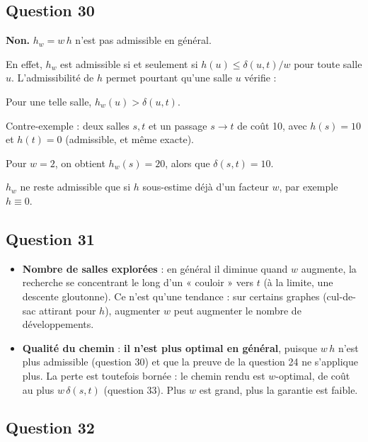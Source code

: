 \documentclass[11pt,a4paper]{article}
\providecommand{\tightlist}{\setlength{\itemsep}{0pt}\setlength{\parskip}{0pt}}
\newcommand{\equationajustee}[1]{%
  \sbox{\boiteequation}{$\displaystyle #1$}%
  \ifdim\wd\boiteequation>\linewidth
    \[\resizebox{\linewidth}{!}{\usebox{\boiteequation}}\]%
  \else
    \[#1\]%
  \fi}
\begin{document}
\hypertarget{question-30}{%
\subsection{Question 30}\label{question-30}}

\textbf{Non.} \(h_w = w\,h\) n'est pas admissible en général.

En effet, \(h_w\) est admissible si et seulement si \(h(u) \le \delta(u,t)/w\) pour toute salle \(u\). L'admissibilité de \(h\) permet pourtant qu'une salle \(u\) vérifie :

\equationajustee{\frac{\delta(u,t)}{w} < h(u) \le \delta(u,t).}

Pour une telle salle, \(h_w(u) > \delta(u,t)\).

Contre-exemple : deux salles \(s, t\) et un passage \(s \to t\) de coût 10, avec \(h(s) = 10\) et \(h(t) = 0\) (admissible, et même exacte).

Pour \(w = 2\), on obtient \(h_w(s) = 20\), alors que \(\delta(s,t) = 10\).

\(h_w\) ne reste admissible que si \(h\) sous-estime déjà d'un facteur \(w\), par exemple \(h \equiv 0\).

\hypertarget{question-31}{%
\subsection{Question 31}\label{question-31}}

\begin{itemize}
\tightlist
\item
  \textbf{Nombre de salles explorées} : en général il diminue quand \(w\) augmente, la recherche se concentrant le long d'un « couloir » vers \(t\) (à la limite, une descente gloutonne). Ce n'est qu'une tendance : sur certains graphes (cul-de-sac attirant pour \(h\)), augmenter \(w\) peut augmenter le nombre de développements.
\item
  \textbf{Qualité du chemin} : \textbf{il n'est plus optimal en général}, puisque \(w\,h\) n'est plus admissible (question 30) et que la preuve de la question 24 ne s'applique plus. La perte est toutefois bornée : le chemin rendu est \(w\)-optimal, de coût au plus \(w\,\delta(s,t)\) (question 33). Plus \(w\) est grand, plus la garantie est faible.
\end{itemize}

\hypertarget{question-32}{%
\subsection{Question 32}\label{question-32}}
\end{document}
